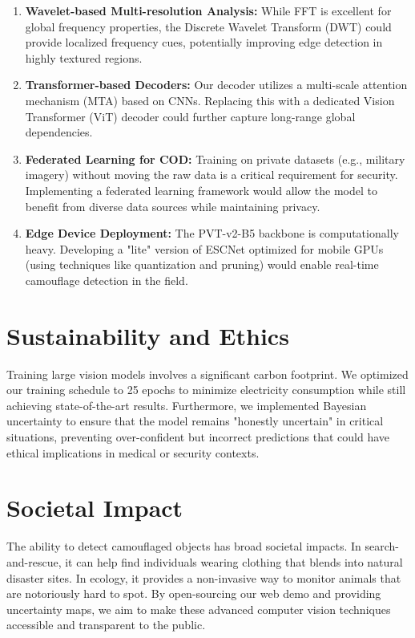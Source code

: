 \documentclass[12pt,a4paper]{report}
\begin{document}
\begin{enumerate}
    \item \textbf{Wavelet-based Multi-resolution Analysis:} While FFT is excellent for global frequency properties, the Discrete Wavelet Transform (DWT) could provide localized frequency cues, potentially improving edge detection in highly textured regions.
    \item \textbf{Transformer-based Decoders:} Our decoder utilizes a multi-scale attention mechanism (MTA) based on CNNs. Replacing this with a dedicated Vision Transformer (ViT) decoder could further capture long-range global dependencies.
    \item \textbf{Federated Learning for COD:} Training on private datasets (e.g., military imagery) without moving the raw data is a critical requirement for security. Implementing a federated learning framework would allow the model to benefit from diverse data sources while maintaining privacy.
    \item \textbf{Edge Device Deployment:} The PVT-v2-B5 backbone is computationally heavy. Developing a "lite" version of ESCNet optimized for mobile GPUs (using techniques like quantization and pruning) would enable real-time camouflage detection in the field.
\end{enumerate}

\section{Sustainability and Ethics}

Training large vision models involves a significant carbon footprint. We optimized our training schedule to 25 epochs to minimize electricity consumption while still achieving state-of-the-art results. Furthermore, we implemented Bayesian uncertainty to ensure that the model remains "honestly uncertain" in critical situations, preventing over-confident but incorrect predictions that could have ethical implications in medical or security contexts.

\section{Societal Impact}

The ability to detect camouflaged objects has broad societal impacts. In search-and-rescue, it can help find individuals wearing clothing that blends into natural disaster sites. In ecology, it provides a non-invasive way to monitor animals that are notoriously hard to spot. By open-sourcing our web demo and providing uncertainty maps, we aim to make these advanced computer vision techniques accessible and transparent to the public.
\end{document}
